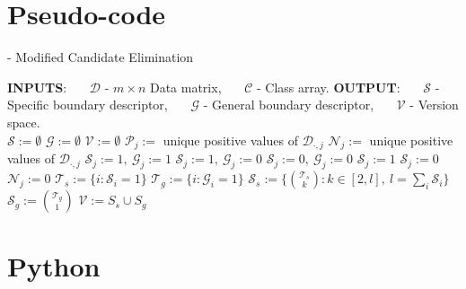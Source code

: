 \section*{Pseudo-code}

\begin{Algorithm}[H]{12cm}
  \caption{ - Modified Candidate Elimination}
  \begin{algorithmic} 
    \State \textbf{INPUTS}: 
    \State \ \ \ $\mathcal{D}$ - $m \times n$ Data matrix,
    \State \ \ \ $\mathcal{C}$ - Class array.
    \State \textbf{OUTPUT}: 
    \State \ \ \ $\mathcal{S}$ - Specific boundary descriptor,
    \State \ \ \ $\mathcal{G}$ - General boundary descriptor, 
    \State \ \ \ $\mathcal{V}$ - Version space.
    \\
    \hrulefill
      \State $\mathcal{S} := \emptyset$
      \State $\mathcal{G} := \emptyset$
      \State $\mathcal{V} := \emptyset$
        \State $\mathcal{P}_j :=$ unique positive values of $\mathcal{D}_{\cdot,j}$
        \State $\mathcal{N}_j :=$ unique positive values of $\mathcal{D}_{\cdot,j}$
          \State $\mathcal{S}_j := 1,\ \mathcal{G}_j := 1$
          \State $\mathcal{S}_j := 1,\ \mathcal{G}_j := 0$
          \State $\mathcal{S}_j := 0,\ \mathcal{G}_j := 0$
            \State $\mathcal{S}_j := 1$
          \Else
            \State $\mathcal{S}_j := 0$
          \EndIf
          \State $\mathcal{N}_j := 0$
        \EndIf
      \EndFor
      \State $\mathcal{T}_s := \{i : \mathcal{S}_i = 1\}$
      \State $\mathcal{T}_g := \{i : \mathcal{G}_i = 1\}$
      \State $\mathcal{S}_s := \{\binom{\mathcal{T}_s}{k} : k \in [2,l],\ l = \sum_i \mathcal{S}_i\}$
      \State $\mathcal{S}_g := \binom{\mathcal{T}_g}{1}$
      \State $\mathcal{V} := S_s \cup S_g$
    \EndFunction
  \end{algorithmic}
\end{Algorithm}


\section*{Python}








